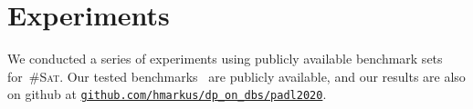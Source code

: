 \documentclass{llncs}
\newcommand{\cSAT}{\textsc{\#Sat}\xspace}%
\newcommand{\tab}[1]{\ensuremath{\tau_{#1}}}
\begin{document}




\section{Experiments}
\label{sec:experiments}
%
We conducted a series of experiments using publicly available benchmark sets for~\cSAT.
Our tested benchmarks~\cite{FichteEtAl18b} 
are publicly available,
and our results are
also on github at
\href{https://github.com/hmarkus/dp_on_dbs/tree/padl2020}{\nolinkurl{github.com/hmarkus/dp_on_dbs/padl2020}}.
\end{document}
